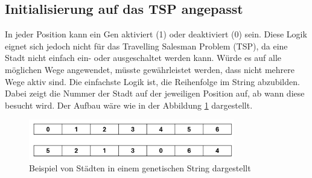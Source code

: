 \subsection{Initialisierung auf das TSP angepasst
\label{buch:paper:varalg:subsection:initialization_tsp}}
In jeder Position kann ein Gen aktiviert (1) oder deaktiviert (0) sein.
Diese Logik eignet sich jedoch nicht für das Travelling Salesman 
Problem (TSP), da eine Stadt nicht einfach ein- oder ausgeschaltet werden kann.
Würde es auf alle möglichen Wege angewendet, müsste gewährleistet werden, 
dass nicht mehrere Wege aktiv sind. Die einfachste Logik ist, die Reihenfolge  
im String abzubilden. Dabei zeigt die Nummer der Stadt auf der jeweiligen Position
auf, ab wann diese besucht wird. Der Aufbau wäre wie in der 
Abbildung \ref{fig:cities_genetic_string} dargestellt.
\begin{figure}
	\centering
	\includegraphics[width=0.8\textwidth]{
        papers/varalg/images/teil3/02GeneticStringCities.png
        }
	\caption{Beispiel von Städten in einem genetischen String dargestellt}
	\label{fig:cities_genetic_string}
\end{figure}
